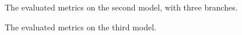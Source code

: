 \documentclass[twocolumn]{article}
\begin{document}
	\begin{figure}[htb]
		\centering
		\caption{The evaluated metrics on the second model, with three branches.}
		\label{fig:model2_2_metrics}
	\end{figure}
	\begin{figure}[htb]
		
		\centering
		\caption{The evaluated metrics on the third model.}
		\label{fig:model3_metrics}
	\end{figure}
\end{document}

